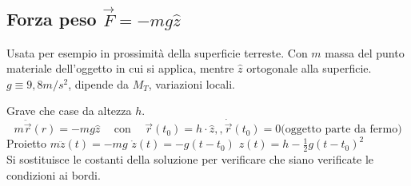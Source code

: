 \subsection{Forza peso $\vec{F} = -mg\hat{z}$}
Usata per esempio in prossimità della superficie terreste. Con $m$ massa del punto materiale dell'oggetto in cui si applica, mentre $\hat{z}$ ortogonale alla superficie. 
$g \equiv 9,8 m/s^2$, dipende da $M_T$, variazioni locali.
\begin{example}
    Grave che case da altezza $h$.
    $$m\ddot{\vec{r}}(r) = -mg\hat{z} \hspace{15pt} \text{con}\hspace{15pt} \vec{r}(t_0) = h \cdot \hat{z},, \dot{\vec{r}}(t_0) = 0 \text{(oggetto parte da fermo)}$$
    Proietto $m\ddot{z}(t)= -mg$ \hspace{10pt} $\dot{z}(t) = -g(t - t_0)$ \hspace{10pt} $z(t) = h - \frac{1}{2}g(t - t_0)^2$\\
    Si sostituisce le costanti della soluzione per verificare che siano verificate le condizioni ai bordi.
\end{example}

